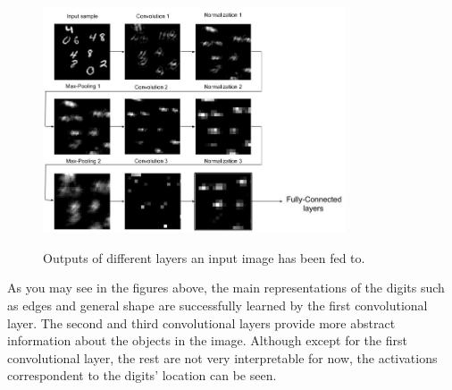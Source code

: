 %


\begin{figure}[H]
	\centering
	{\includegraphics[width=0.8\textwidth]{images/mnist_convs}}
	\caption{Outputs of different layers an input image has been fed to. }
	\label{fig:convha}
\end{figure}

As you may see in the figures above, the main representations of the digits such as edges and general shape are successfully learned by the first convolutional layer. The second and third  convolutional layers provide more abstract information about the objects in the image. Although except for the first convolutional layer, the rest are not very interpretable for now, the activations correspondent to the digits' location can be seen. 




